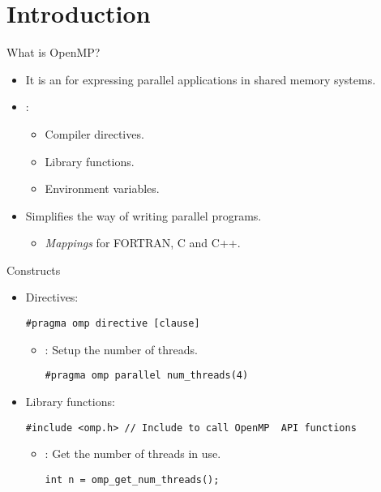 \section{Introduction}

\begin{frame}[t]{What is OpenMP?}
\begin{itemize}
  \item It is an  for expressing parallel applications
        in shared memory systems.

  \item {}:
    \begin{itemize}
      \item Compiler directives.
      \item Library functions.
      \item Environment variables.
    \end{itemize}

  \item Simplifies the way of writing parallel programs.
    \begin{itemize}
      \item \emph{Mappings} for FORTRAN, C and C++.
    \end{itemize}
\end{itemize}
\end{frame}

\begin{frame}[t,fragile]{Constructs}
\begin{itemize}
  \item Directives:
\begin{lstlisting}
#pragma omp directive [clause]
\end{lstlisting}

  \begin{itemize}
    \item {}: Setup the number of threads.
\begin{lstlisting}
#pragma omp parallel num_threads(4)
\end{lstlisting}
  \end{itemize}

  \item Library functions:
\begin{lstlisting}
#include <omp.h> // Include to call OpenMP  API functions
\end{lstlisting}
    \begin{itemize}
      \item {}: Get the number of threads in use.
\begin{lstlisting}
int n = omp_get_num_threads();
\end{lstlisting}
    \end{itemize}

\end{itemize}
\end{frame}


